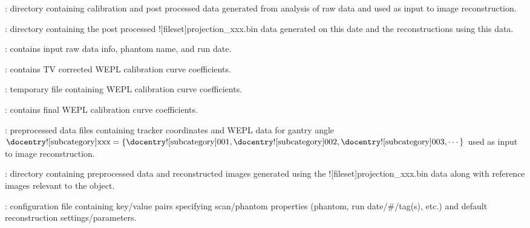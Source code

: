 \begin{tcbenvironment}
\begin{tcbenumbox}
\begin{ThinEnum}
\begin{ThinEnum}
\begin{ThinEnum}
\begin{ThinEnum}
\begin{ThinEnum}
\begin{ThinEnum}
                        \end{ThinEnum}
                        \item {} : directory containing calibration and post processed data generated from analysis of raw data and used as input to image reconstruction.
                        \begin{ThinEnum}
                                \item {} : directory containing the post processed \docentry![fileset]{projection\_xxx.bin} data generated on this date and the reconstructions using this data.
                                \begin{ThinEnum}
                                    \item {} : contains input raw data info, phantom name, and run date.
                                    \item {} : contains TV corrected WEPL calibration curve coefficients.
                                    \item {} : temporary file containing WEPL calibration curve coefficients.
                                    \item {} : contains final WEPL calibration curve coefficients.
                                    \item {} : preprocessed data files containing tracker coordinates and WEPL data for gantry angle $\text{\docentry![subcategory]{xxx}} =\{\text{\docentry![subcategory]{001}}, \text{\docentry![subcategory]{002}}, \text{\docentry![subcategory]{003}}, \cdots\}$ used as input to image reconstruction.
                                    \item {} : directory containing preprocessed data and reconstructed images generated using the \docentry![fileset]{projection\_xxx.bin} data along with reference images relevant to the object.
                               \begin{ThinEnum}
                                    \item {} : configuration file containing key/value pairs specifying scan/phantom properties
                                    (phantom, run date/\#/tag(s), etc.) and default reconstruction settings/parameters.

\end{ThinEnum}
\end{ThinEnum}
\end{ThinEnum}
\end{ThinEnum}
\end{ThinEnum}
\end{ThinEnum}
\end{ThinEnum}
\end{ThinEnum}
\end{tcbenumbox}
\end{tcbenvironment}
